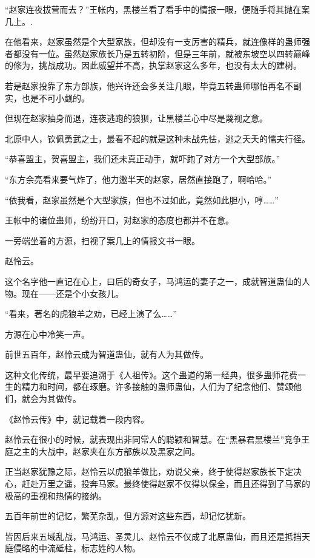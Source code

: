 
\begin{this_body}

“赵家连夜拔营而去？”王帐内，黑楼兰看了看手中的情报一眼，便随手将其抛在案几上。.

在他看来，赵家虽然是个大型家族，但却没有一支厉害的精兵，就连像样的蛊师强者都没有一位。虽然赵家族长乃是五转初阶，但是三年前，就被东坡空以四转巅峰的修为，挑战成功。因此威望并不高，执掌赵家这么多年，也没有太大的建树。

若是赵家投靠了东方部族，他兴许还会多关注几眼，毕竟五转蛊师哪怕再名不副实，也是不可小觑的。

但现在赵家抽身而退，连夜逃跑的狼狈，让黑楼兰心中尽是蔑视之意。

北原中人，钦佩勇武之士，最看不起的就是这种未战先怯，逃之夭夭的懦夫行径。

“恭喜盟主，贺喜盟主，我们还未真正动手，就吓跑了对方一个大型部族。”

“东方余亮看来要气炸了，他力邀半天的赵家，居然直接跑了，啊哈哈。”

“依我看，赵家虽然是个大型家族，但也不过如此，竟然如此胆小，哼……”

王帐中的诸位蛊师，纷纷开口，对赵家的态度也都并不在意。

一旁端坐着的方源，扫视了案几上的情报文书一眼。

赵怜云。

这个名字他一直记在心上，曰后的奇女子，马鸿运的妻子之一，成就智道蛊仙的人物。现在——还是个小女孩儿。

“看来，著名的虎狼羊之劝，已经上演了么……”

方源在心中冷笑一声。

前世五百年，赵怜云成为智道蛊仙，就有人为其做传。

这种文化传统，最早要追溯于《人祖传》。这个蛊道的第一经典，很多蛊师花费一生的精力和时间，都在琢磨。许多接触的蛊师蛊仙，人们为了纪念他们、赞颂他们，就会为其做传。

《赵怜云传》中，就记载着一段内容。

赵怜云在很小的时候，就表现出非同常人的聪颖和智慧。在“黑暴君黑楼兰”竞争王庭之主的大战中，赵家夹在东方部族以及黑家之间。

正当赵家犹豫之际，赵怜云以虎狼羊做比，劝说父亲，终于使得赵家族长下定决心，赶赴万里之遥，投奔马家。最终使得赵家不仅得以保全，而且还得到了马家的极高的重视和热情的接纳。

五百年前世的记忆，繁芜杂乱，但方源对这些东西，却记忆犹新。

皆因后来五域乱战，马鸿运、圣灵儿、赵怜云不仅成了北原蛊仙，而且还是抵挡天庭侵略的中流砥柱，标志姓的人物。


\end{this_body}
